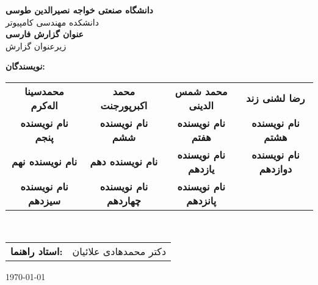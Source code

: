 \begin{titlepage}
    \centering
    
    \vspace*{2cm}
    
    {\Large \textbf{دانشگاه صنعتی خواجه نصیرالدین طوسی}}\\[0.5cm]
    {\large دانشکده مهندسی کامپیوتر}\\[1cm]
    
    {\Huge \textbf{عنوان گزارش فارسی}}\\[0.5cm]
    {\Large زیرعنوان گزارش}\\[1cm]
    
    {\large
        \textbf{نویسندگان:}\\[0.2cm]
        \begin{tabular}{cccc}
            \textbf{محمدسینا اله‌کرم} & \textbf{محمد اکبرپورجنت} &
            \textbf{محمد شمس الدینی} & \textbf{رضا لشنی زند} \\ 
            \textbf{نام نویسنده پنجم} & \textbf{نام نویسنده ششم} &
            \textbf{نام نویسنده هفتم} & \textbf{نام نویسنده هشتم} \\
            \textbf{نام نویسنده نهم} & \textbf{نام نویسنده دهم} &
            \textbf{نام نویسنده یازدهم} & \textbf{نام نویسنده دوازدهم} \\
            \textbf{نام نویسنده سیزدهم} & \textbf{نام نویسنده چهاردهم} &
            \textbf{نام نویسنده پانزدهم} \\
            
        \end{tabular}
        \\[1.5cm]
        \begin{tabular}{rl}
            \textbf{استاد راهنما:} & دکتر محمدهادی علائیان \\[0.3cm]
        \end{tabular}
    }
    
    \vfill
    
    {\large \today}
    
\end{titlepage}

\newpage

